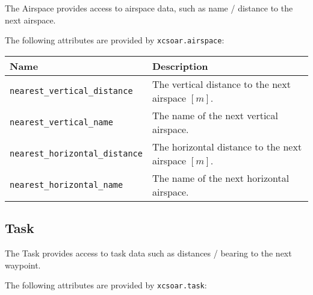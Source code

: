 The Airspace provides access to airspace data, such as name / distance
to the next airspace.

The following attributes are provided by \verb|xcsoar.airspace|:

\begin{maxipage}
\begin{tabularx}{1.9\textwidth}{l|X}
Name & Description \\
\hline\hline

\verb|nearest_vertical_distance| & The vertical distance to the next airspace
$[{m}]$.\\

\hline

\verb|nearest_vertical_name| & The name of the next vertical airspace. \\

\hline

\verb|nearest_horizontal_distance| & The horizontal distance to the next airspace
$[{m}]$. \\

\hline

\verb|nearest_horizontal_name| & The name of the next horizontal airspace. \\

\end{tabularx}
\end{maxipage}

\subsection{Task}\label{sec:lua.task}

The Task provides access to task data such as distances / bearing to the
next waypoint.

The following attributes are provided by \verb|xcsoar.task|:

